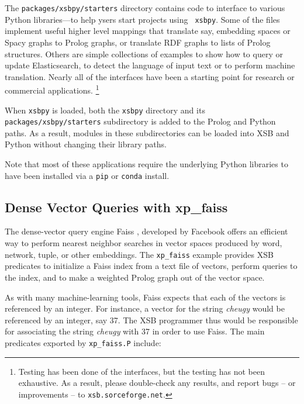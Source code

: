 The {\tt packages/xsbpy/starters} directory contains code to interface
to various Python libraries---to help ysers start projects using {\tt
  xsbpy}.  Some of the files implement useful higher level mappings
that translate say, embedding spaces or Spacy graphs to Prolog graphs,
or translate RDF graphs to lists of Prolog structures.  Others are
simple collections of examples to show how to query or update
Elasticsearch, to detect the language of input text or to perform
machine translation.  Nearly all of the interfaces have been a
starting point for research or commercial
applications.  \footnote{Testing has been done of the interfaces, but
  the testing has not been exhaustive.  As a result, please
  double-check any results, and report bugs -- or improvements -- to
  {\tt xsb.sorceforge.net}.}

When {\tt xsbpy} is loaded, both the {\tt xsbpy} directory and its
{\tt packages/xsbpy/starters} subdirectory is added to the Prolog and
Python paths.  As a result, modules in these subdirectories can be
loaded into XSB and Python without changing their library paths.

Note that most of these applications require the underlying Python
libraries to have been installed via a {\tt pip} or {\tt conda}
install.

\subsection{Dense Vector Queries with xp\_faiss}
The dense-vector query engine Faiss \cite{JDH17}, developed by
Facebook offers an efficient way to perform nearest neighbor searches
in vector spaces produced by word, network, tuple, or other
embeddings.  The {\tt xp\_faiss} example provides XSB predicates to
initialize a Faiss index from a text file of vectors, perform queries
to the index, and to make a weighted Prolog graph out of the vector
space.  

As with many machine-learning tools, Faiss expects that each of the
vectors is referenced by an integer.  For instance, a vector for the
string {\em cheugy} would be referenced by an integer, say 37.  The
XSB programmer thus would be responsible for associating the string
{\em cheugy} with 37 in order to use Faiss.  The main predicates
exported by {\tt xp\_faiss.P} include:

